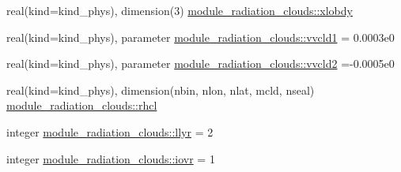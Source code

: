 \begin{DoxyCompactItemize}
\item 
real(kind=kind\+\_\+phys), dimension(3) \hyperlink{group__module__radiation__clouds_gaab28f783919380e5ff7f925f70355a57}{module\+\_\+radiation\+\_\+clouds\+::xlobdy}
\item 
real(kind=kind\+\_\+phys), parameter \hyperlink{group__module__radiation__clouds_ga6ec3c0444de53580befd4bb4d39844d3}{module\+\_\+radiation\+\_\+clouds\+::vvcld1} = 0.\+0003e0
\item 
real(kind=kind\+\_\+phys), parameter \hyperlink{group__module__radiation__clouds_ga67962e77fb073cc25cafaaba0c2fa833}{module\+\_\+radiation\+\_\+clouds\+::vvcld2} =-\/0.\+0005e0
\item 
real(kind=kind\+\_\+phys), dimension(nbin, nlon, nlat, mcld, nseal) \hyperlink{group__module__radiation__clouds_ga9673faf82ef00e0501763664743e3720}{module\+\_\+radiation\+\_\+clouds\+::rhcl}
\item 
integer \hyperlink{group__module__radiation__clouds_ga3390b20d42afccb3ec569a5b69a93f6e}{module\+\_\+radiation\+\_\+clouds\+::llyr} = 2
\item 
integer \hyperlink{group__module__radiation__clouds_ga5cfafee79e8cf066ddd8440cdfdc41a0}{module\+\_\+radiation\+\_\+clouds\+::iovr} = 1
\end{DoxyCompactItemize}
